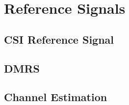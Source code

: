 \chapter{Reference Signals}

\section{CSI Reference Signal}

\section{DMRS}

\section{Channel Estimation}